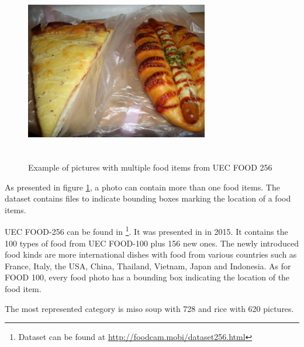 \begin{figure}[h]
    \includegraphics[width=8cm, height=8cm]{img/multiple_food_items_4}
    \caption{Example of pictures with multiple food items from UEC FOOD 256}
    \label{fig:presentation_multiple_food_items}
\end{figure}

As presented in figure \ref{fig:presentation_multiple_food_items}, a photo can contain more than one food items. The dataset contains files to indicate bounding boxes marking the location of a food items.

UEC FOOD-256 can be found in \footnote{Dataset can be found at \url{http://foodcam.mobi/dataset256.html}}. It was presented in \cite{Kawano2015} in 2015. It contains  the 100 types of food from UEC FOOD-100 plus 156 new ones. The newly introduced food kinds are more international dishes with food from various countries such as France, Italy, the USA, China, Thailand, Vietnam, Japan and Indonesia. As for FOOD 100, every food photo has a bounding box indicating the location of the food item.

The most represented category is miso soup with 728 and rice with 620 pictures.
